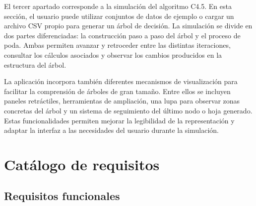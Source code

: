 El tercer apartado corresponde a la simulación del algoritmo C4.5. En esta sección, el usuario puede utilizar conjuntos de datos de ejemplo o cargar un archivo CSV propio para generar un árbol de decisión. La simulación se divide en dos partes diferenciadas: la construcción paso a paso del árbol y el proceso de poda. Ambas permiten avanzar y retroceder entre las distintas iteraciones, consultar los cálculos asociados y observar los cambios producidos en la estructura del árbol.

La aplicación incorpora también diferentes mecanismos de visualización para facilitar la comprensión de árboles de gran tamaño. Entre ellos se incluyen paneles retráctiles, herramientas de ampliación, una lupa para observar zonas concretas del árbol y un sistema de seguimiento del último nodo o hoja generado. Estas funcionalidades permiten mejorar la legibilidad de la representación y adaptar la interfaz a las necesidades del usuario durante la simulación.

\section{Catálogo de requisitos}

\subsection{Requisitos funcionales}

